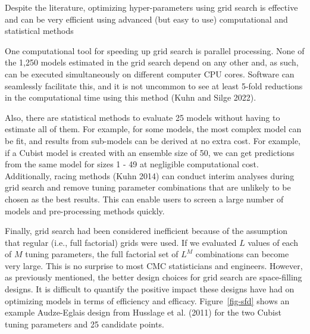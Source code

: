 \documentclass[
  letterpaper,
  DIV=11,
  numbers=noendperiod]{scrartcl}
\begin{document}
\begin{tcolorbox}[enhanced jigsaw, title=\textcolor{quarto-callout-important-color}{\faExclamation}\hspace{0.5em}{\textbf{WTF} \#11}, rightrule=.15mm, leftrule=.75mm, bottomtitle=1mm, opacityback=0, opacitybacktitle=0.6, bottomrule=.15mm, arc=.35mm, colframe=quarto-callout-important-color-frame, breakable, toprule=.15mm, toptitle=1mm, colback=white, titlerule=0mm, coltitle=black, left=2mm, colbacktitle=quarto-callout-important-color!10!white]

Despite the literature, optimizing hyper-parameters using grid search is
effective and can be very efficient using advanced (but easy to use)
computational and statistical methods

\end{tcolorbox}

One computational tool for speeding up grid search is parallel
processing. None of the 1,250 models estimated in the grid search depend
on any other and, as such, can be executed simultaneously on different
computer CPU cores. Software can seamlessly facilitate this, and it is
not uncommon to see at least 5-fold reductions in the computational time
using this method (Kuhn and Silge 2022).

Also, there are statistical methods to evaluate 25 models without having
to estimate all of them. For example, for some models, the most complex
model can be fit, and results from sub-models can be derived at no extra
cost. For example, if a Cubist model is created with an ensemble size of
50, we can get predictions from the same model for sizes 1 - 49 at
negligible computational cost. Additionally, racing methods (Kuhn 2014)
can conduct interim analyses during grid search and remove tuning
parameter combinations that are unlikely to be chosen as the best
results. This can enable users to screen a large number of models and
pre-processing methods quickly.

Finally, grid search had been considered inefficient because of the
assumption that regular (i.e., full factorial) grids were used. If we
evaluated \(L\) values of each of \(M\) tuning parameters, the full
factorial set of \(L^M\) combinations can become very large. This is no
surprise to most CMC statisticians and engineers. However, as previously
mentioned, the better design choices for grid search are space-filling
designs. It is difficult to quantify the positive impact these designs
have had on optimizing models in terms of efficiency and efficacy.
Figure~\ref{fig-sfd} shows an example Audze-Eglais design from Husslage
et al. (2011) for the two Cubist tuning parameters and 25 candidate
points.
\end{document}

